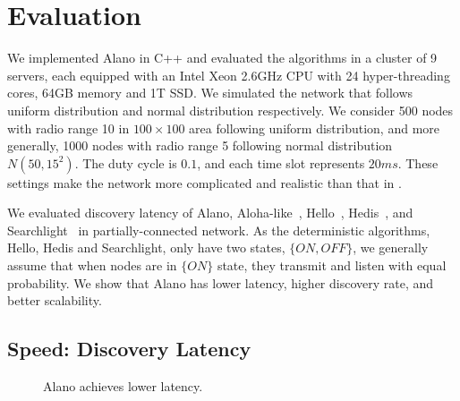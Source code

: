 \section{Evaluation}
\label{Evaluation}


We implemented Alano in C++ and evaluated the algorithms in a cluster of 9 servers, each equipped with an Intel Xeon 2.6GHz CPU with 24 hyper-threading cores, 64GB memory and 1T SSD. 
We simulated the network that follows uniform distribution and normal distribution respectively. We consider 500 nodes with radio range 10 in $100\times100$ area following uniform distribution, and more generally, 1000 nodes with radio range 5 following normal distribution $N(50, 15^2)$. The duty cycle is $0.1$, and each time slot represents $20ms$. 
These settings make the network more complicated and realistic than that in \cite{wang2015blinddate, qiu2016talk, sun2014hello, bakht2012searchlight, chen2015heterogeneous, kandhalu2010u, you2011aloha, mcglynn2001birthday, song2014probabilistic, vasudevan2009neighbor}.



We evaluated discovery latency of Alano, Aloha-like~\cite{you2011aloha}, Hello~\cite{sun2014hello}, Hedis~\cite{chen2015heterogeneous}, and Searchlight~\cite{bakht2012searchlight} in partially-connected network. As the deterministic algorithms, Hello, Hedis and Searchlight, only have two states, $\{ON, OFF\}$, we generally assume that when nodes are in $\{ON\}$ state, they transmit and listen with equal probability.
We show that Alano has lower latency, higher discovery rate, and better scalability.

\subsection{Speed: Discovery Latency}

\begin{figure}[!h]
\centering
{}
\hspace{0.01in}
\caption{Alano achieves lower latency.}
\label{fig_latency}
\end{figure}

